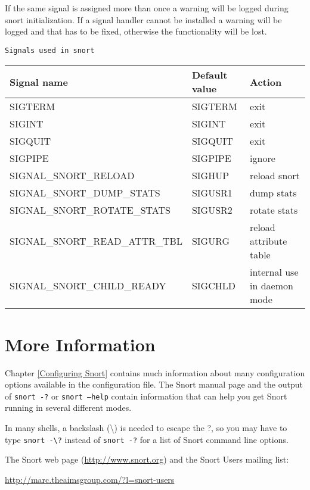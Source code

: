 \documentclass[english]{report}
\newenvironment{note}{
\samepage
    \vspace{10pt}{\textsf{
        {\hspace{7pt}\Huge{$\triangle$\hspace{-12.5pt}{\Large{$^!$}}}}\hspace{5pt}
        {\Large{NOTE}}
    }
    }
   \begin{center}
    \par\vspace{-17pt}

    \begin{lrbox}{\savepar}
    \begin{minipage}[r]{6in}
}
{
    \end{minipage}
    \end{lrbox}
    \fbox{
        \usebox{
            \savepar
	}
    }
    \par\vskip10pt
    \end{center}
}
\newenvironment{note}{
        \begin{rawhtml}
        <p><table border="1"><tr><td><b>
        Note:&nbsp;&nbsp;</b>
        \end{rawhtml}
}{
        \begin{rawhtml}
        </b></td></tr></table></p>
        \end{rawhtml}
}
\begin{document}
If the same signal is assigned more than once a warning will be logged 
during snort initialization. If a signal handler cannot be installed a warning
will be logged and that has to be fixed, otherwise the functionality will be lost.

\texttt{Signals used in snort}

\begin{tabular}{|l|l|l|}
\hline
Signal name & Default value & Action \\
\hline
\hline
SIGTERM & SIGTERM & exit \\
\hline
SIGINT & SIGINT & exit \\
\hline
SIGQUIT & SIGQUIT & exit \\
\hline
SIGPIPE & SIGPIPE & ignore \\
\hline
SIGNAL\_SNORT\_RELOAD & SIGHUP & reload snort \\
\hline
SIGNAL\_SNORT\_DUMP\_STATS & SIGUSR1 & dump stats \\
\hline
SIGNAL\_SNORT\_ROTATE\_STATS & SIGUSR2 & rotate stats \\
\hline
SIGNAL\_SNORT\_READ\_ATTR\_TBL & SIGURG & reload attribute table \\
\hline
SIGNAL\_SNORT\_CHILD\_READY & SIGCHLD & internal use in daemon mode \\
\hline
\end{tabular}

\section{More Information}

Chapter \ref{Configuring Snort} contains much information about many
configuration options available in the configuration file.  The Snort manual
page and the output of \texttt{snort -?} or \texttt{snort --help} contain
information that can help you get Snort running in several different modes.

\begin{note}

In many shells, a backslash (\textbackslash{}) is needed to escape the ?, so
you may have to type \texttt{snort -\textbackslash{}?} instead of \texttt{snort
-?} for a list of Snort command line options.

\end{note}

The Snort web page (\url{http://www.snort.org}) and the Snort Users mailing
list:

\url{http://marc.theaimsgroup.com/?l=snort-users}
\end{document}

